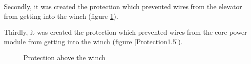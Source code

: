 Secondly, it was created the protection which prevented wires from the elevator from getting into the winch (figure \ref{Protection1.4}).

Thirdly, it was created the protection which prevented wires from the core power module from getting into the winch (figure \ref{Protection1.5}).

\begin{figure}[H]
	\begin{minipage}[h]{0.47\linewidth}
		\caption{Protection above the winch}
		\label{Protection1.4}
	\end{minipage}
	\hfill
	\begin{minipage}[h]{0.47\linewidth}

\end{minipage}
\end{figure}
